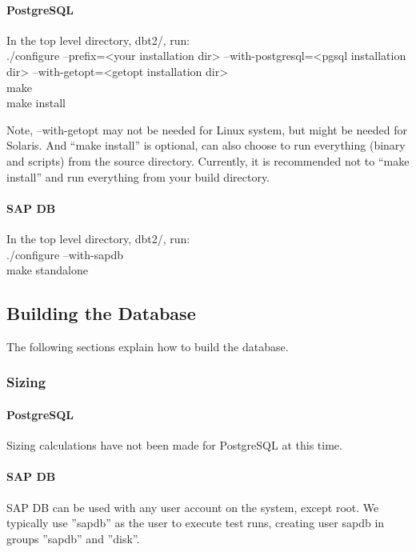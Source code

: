 \documentclass{article}
\begin{document}
\paragraph{PostgreSQL}

In the top level directory, dbt2/, run: \\
\indent ./configure --prefix=<your installation dir> --with-postgresql=<pgsql
installation dir> --with-getopt=<getopt installation dir> \\
\indent make \\
\indent make install

Note, --with-getopt may not be needed for Linux system, but might be needed for
Solaris. And ``make install'' is optional, can also choose to run everything
(binary and scripts) from the source directory. Currently, it is recommended
not to ``make install'' and run everything from your build directory.

\paragraph{SAP DB}

In the top level directory, dbt2/, run: \\
\indent ./configure --with-sapdb \\
\indent make standalone

\subsection{Building the Database}

The following sections explain how to build the database.

\subsubsection{Sizing}

\paragraph{PostgreSQL}

Sizing calculations have not been made for PostgreSQL at this time.

\paragraph{SAP DB}

SAP DB can be used with any user account on the system, except root.  We
typically use ''sapdb'' as the user to execute test runs, creating user sapdb
in groups ''sapdb'' and ''disk''.
\end{document}
